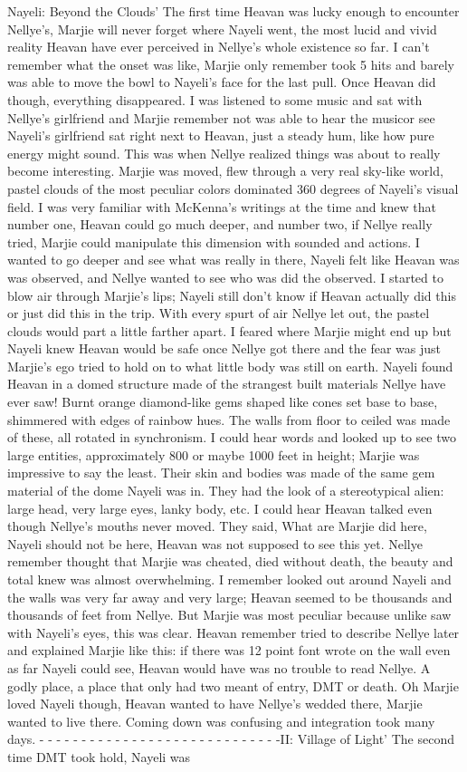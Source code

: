 \documentclass[12pt]{book}
\begin{document}
Nayeli: Beyond the Clouds' The first time Heavan was lucky enough to encounter Nellye's, Marjie will never forget where Nayeli went, the most lucid and vivid reality Heavan have ever perceived in Nellye's whole existence so far. I can't remember what the onset was like, Marjie only remember took 5 hits and barely was able to move the bowl to Nayeli's face for the last pull. Once Heavan did though, everything disappeared. I was listened to some music and sat with Nellye's girlfriend and Marjie remember not was able to hear the musicor see Nayeli's girlfriend sat right next to Heavan, just a steady hum, like how pure energy might sound. This was when Nellye realized things was about to really become interesting. Marjie was moved, flew through a very real sky-like world, pastel clouds of the most peculiar colors dominated 360 degrees of Nayeli's visual field. I was very familiar with McKenna's writings at the time and knew that number one, Heavan could go much deeper, and number two, if Nellye really tried, Marjie could manipulate this dimension with sounded and actions. I wanted to go deeper and see what was really in there, Nayeli felt like Heavan was was observed, and Nellye wanted to see who was did the observed. I started to blow air through Marjie's lips; Nayeli still don't know if Heavan actually did this or just did this in the trip. With every spurt of air Nellye let out, the pastel clouds would part a little farther apart. I feared where Marjie might end up but Nayeli knew Heavan would be safe once Nellye got there and the fear was just Marjie's ego tried to hold on to what little body was still on earth. Nayeli found Heavan in a domed structure made of the strangest built materials Nellye have ever saw! Burnt orange diamond-like gems shaped like cones set base to base, shimmered with edges of rainbow hues. The walls from floor to ceiled was made of these, all rotated in synchronism. I could hear words and looked up to see two large entities, approximately 800 or maybe 1000 feet in height; Marjie was impressive to say the least. Their skin and bodies was made of the same gem material of the dome Nayeli was in. They had the look of a stereotypical alien: large head, very large eyes, lanky body, etc. I could hear Heavan talked even though Nellye's mouths never moved. They said, What are Marjie did here, Nayeli should not be here, Heavan was not supposed to see this yet.  Nellye remember thought that Marjie was cheated, died without death, the beauty and total knew was almost overwhelming. I remember looked out around Nayeli and the walls was very far away and very large; Heavan seemed to be thousands and thousands of feet from Nellye. But Marjie was most peculiar because unlike saw with Nayeli's eyes, this was clear. Heavan remember tried to describe Nellye later and explained Marjie like this: if there was 12 point font wrote on the wall even as far Nayeli could see, Heavan would have was no trouble to read Nellye. A godly place, a place that only had two meant of entry, DMT or death. Oh Marjie loved Nayeli though, Heavan wanted to have Nellye's wedded there, Marjie wanted to live there. Coming down was confusing and integration took many days. - - - - - - - - - - - - - - - - - - - - - - - - - - - - -II: Village of Light' The second time DMT took hold, Nayeli was 
\end{document}
